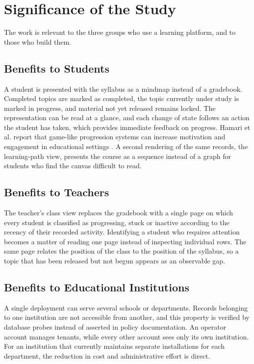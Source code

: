 \chapter{Significance of the Study}

The work is relevant to the three groups who use a learning platform, and to those who build them.

\section{Benefits to Students}

A student is presented with the syllabus as a mindmap instead of a gradebook. Completed topics are marked as completed, the topic currently under study is marked in progress, and material not yet released remains locked. The representation can be read at a glance, and each change of state follows an action the student has taken, which provides immediate feedback on progress. Hamari et al. report that game-like progression systems can increase motivation and engagement in educational settings \cite{hamari2014does}. A second rendering of the same records, the learning-path view, presents the course as a sequence instead of a graph for students who find the canvas difficult to read.

\section{Benefits to Teachers}

The teacher's class view replaces the gradebook with a single page on which every student is classified as progressing, stuck or inactive according to the recency of their recorded activity. Identifying a student who requires attention becomes a matter of reading one page instead of inspecting individual rows. The same page relates the position of the class to the position of the syllabus, so a topic that has been released but not begun appears as an observable gap.

\section{Benefits to Educational Institutions}

A single deployment can serve several schools or departments. Records belonging to one institution are not accessible from another, and this property is verified by database probes instead of asserted in policy documentation. An operator account manages tenants, while every other account sees only its own institution. For an institution that currently maintains separate installations for each department, the reduction in cost and administrative effort is direct.

